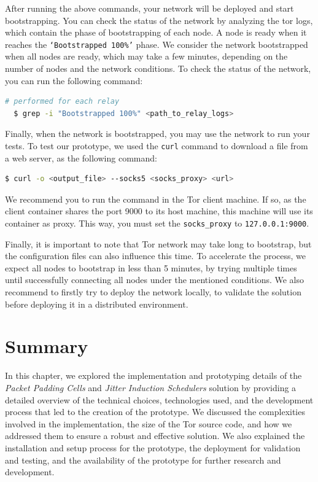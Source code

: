 After running the above commands, your network will be deployed and start bootstrapping. You can check the status of the network by analyzing the tor logs, which contain the phase of bootstrapping of each node. A node is ready when it reaches the \texttt{`Bootstrapped 100\%'} phase. We consider the network bootstrapped when all nodes are ready, which may take a few minutes, depending on the number of nodes and the network conditions. To check the status of the network, you can run the following command:
\begin{lstlisting}[language=bash]
  # performed for each relay
  $ grep -i "Bootstrapped 100%" <path_to_relay_logs> 
\end{lstlisting}

Finally, when the network is bootstrapped, you may use the network to run your tests. To test our prototype, we used the \texttt{curl} command to download a file from a web server, as the following command:
\begin{lstlisting}[language=bash]
  $ curl -o <output_file> --socks5 <socks_proxy> <url>
\end{lstlisting}

We recommend you to run the command in the Tor client machine. If so, as the client container shares the port 9000 to its host machine, this machine will use its container as proxy. This way, you must set the \texttt{socks\_proxy} to \texttt{127.0.0.1:9000}.

Finally, it is important to note that Tor network may take long to bootstrap, but the configuration files can also influence this time. To accelerate the process, we expect all nodes to bootstrap in less than 5 minutes, by trying multiple times until successfully connecting all nodes under the mentioned conditions. We also recommend to firstly try to deploy the network locally, to validate the solution before deploying it in a distributed environment. 

\section{Summary}\label{sec:implementation_summary}
In this chapter, we explored the implementation and prototyping details of the \textit{Packet Padding Cells} and \textit{Jitter Induction Schedulers} solution by providing a detailed overview of the technical choices, technologies used, and the development process that led to the creation of the prototype. We discussed the complexities involved in the implementation, the size of the Tor source code, and how we addressed them to ensure a robust and effective solution. We also explained the installation and setup process for the prototype, the deployment for validation and testing, and the availability of the prototype for further research and development.
